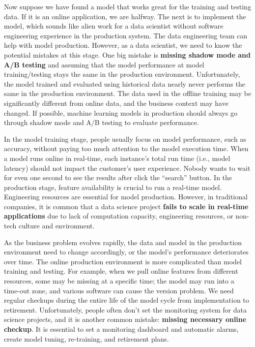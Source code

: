 \documentclass[
  12pt,
]{krantz}
\begin{document}
Now suppose we have found a model that works great for the training and testing data. If it is an online application, we are halfway. The next is to implement the model, which sounds like alien work for a data scientist without software engineering experience in the production system. The data engineering team can help with model production. However, as a data scientist, we need to know the potential mistakes at this stage. One big mistake is \textbf{missing shadow mode and A/B testing} and assuming that the model performance at model training/testing stays the same in the production environment. Unfortunately, the model trained and evaluated using historical data nearly never performs the same in the production environment. The data used in the offline training may be significantly different from online data, and the business context may have changed. If possible, machine learning models in production should always go through shadow mode and A/B testing to evaluate performance.

In the model training stage, people usually focus on model performance, such as accuracy, without paying too much attention to the model execution time. When a model runs online in real-time, each instance's total run time (i.e., model latency) should not impact the customer's user experience. Nobody wants to wait for even one second to see the results after click the ``search'' button. In the production stage, feature availability is crucial to run a real-time model. Engineering resources are essential for model production. However, in traditional companies, it is common that a data science project \textbf{fails to scale in real-time applications} due to lack of computation capacity, engineering resources, or non-tech culture and environment.

As the business problem evolves rapidly, the data and model in the production environment need to change accordingly, or the model's performance deteriorates over time. The online production environment is more complicated than model training and testing. For example, when we pull online features from different resources, some may be missing at a specific time; the model may run into a time-out zone, and various software can cause the version problem. We need regular checkups during the entire life of the model cycle from implementation to retirement. Unfortunately, people often don't set the monitoring system for data science projects, and it is another common mistake: \textbf{missing necessary online checkup}. It is essential to set a monitoring dashboard and automatic alarms, create model tuning, re-training, and retirement plans.
\end{document}
